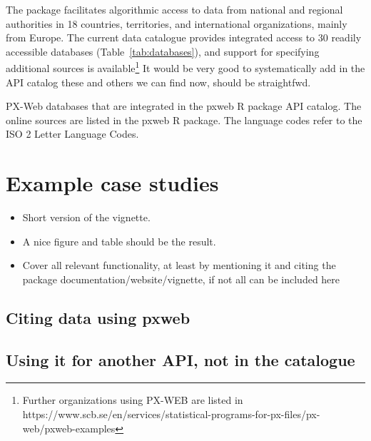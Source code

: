 
The package facilitates algorithmic access to data from national and
regional authorities in 18 countries, territories, and international
organizations, mainly from Europe. The current data catalogue provides
integrated access to 30 readily accessible databases
(Table~\ref{tab:databases}), and support for specifying additional
sources is available\footnote{Further organizations using PX-WEB are
listed in
https://www.scb.se/en/services/statistical-programs-for-px-files/px-web/pxweb-examples} %
It would be very good to systematically add in the API catalog these
and others we can find now, should be straightfwd.

\begin{table}

\caption{\label{tab:databases}PX-Web databases that are integrated in the pxweb R package API catalog. The online sources are listed in the pxweb R package. The language codes refer to the ISO 2 Letter Language Codes.}
\end{table}


\section[Usage]{Example case studies}

\begin{itemize}
    \item Short version of the vignette.  \item A nice figure and
    table should be the result.  \item Cover all relevant
    functionality, at least by mentioning it and citing the package
    documentation/website/vignette, if not all can be included here
\end{itemize}




\subsection{Citing data using pxweb}

\subsection{Using it for another API, not in the catalogue}


